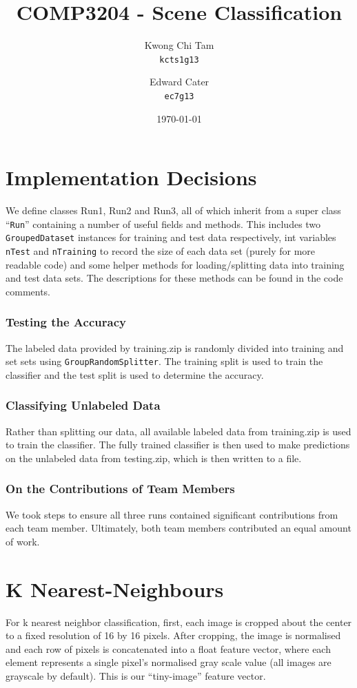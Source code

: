 \documentclass[a4paper]{article}
\title{COMP3204 - Scene Classification}
\author{
    Kwong Chi Tam\\
    \texttt{kcts1g13}
    \and
    Edward Cater\\
    \texttt{ec7g13}  
}
\date{\today}
\begin{document}
\maketitle

\section*{Implementation Decisions}
We define classes Run1, Run2 and Run3, all of which inherit from a super class ``\texttt{Run}'' containing a number of useful fields and methods. This includes two  \texttt{GroupedDataset} instances for training and test data respectively, int variables \texttt{nTest} and \texttt{nTraining} to record the size of each data set (purely for more readable code) and some helper methods for loading/splitting data into training and test data sets. The descriptions for these methods can be found in the code comments.

\subsubsection*{Testing the Accuracy}
The labeled data provided by training.zip is randomly divided into training and set sets using \texttt{GroupRandomSplitter}. The training split is used to train the classifier and the test split is used to determine the accuracy.

\subsubsection*{Classifying Unlabeled Data}
Rather than splitting our data, all available labeled data from training.zip is used to train the classifier. The fully trained classifier is then used to make predictions on the unlabeled data from testing.zip, which is then written to a file.

\subsubsection*{On the Contributions of Team Members}
We took steps to ensure all three runs contained significant contributions from each team member. Ultimately, both team members contributed an equal amount of work.

\section{K Nearest-Neighbours}
For k nearest neighbor classification, first, each image is cropped about the center to a fixed resolution of 16 by 16 pixels. After cropping, the image is normalised and each row of pixels is concatenated into a float feature vector, where each element represents a single pixel’s normalised gray scale value (all images are grayscale by default). This is our “tiny-image” feature vector.
\end{document}

